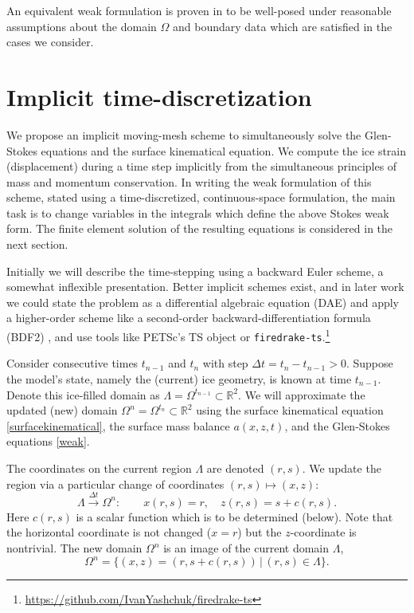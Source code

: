 \documentclass[letterpaper,final,12pt,reqno]{amsart}
\newcommand{\RR}{\mathbb{R}}
\begin{document}
An equivalent weak formulation is proven in \cite[Theorem 3.8]{JouvetRappaz2011} to be well-posed under reasonable assumptions about the domain $\Omega$ and boundary data which are satisfied in the cases we consider.


\section{Implicit time-discretization} \label{sec:implicitstep}

We propose an implicit moving-mesh scheme to simultaneously solve the Glen-Stokes equations and the surface kinematical equation.  We compute the ice strain (displacement) during a time step implicitly from the simultaneous principles of mass and momentum conservation.  In writing the weak formulation of this scheme, stated using a time-discretized, continuous-space formulation, the main task is to change variables in the integrals which define the above Stokes weak form.  The finite element solution of the resulting equations is considered in the next section.

Initially we will describe the time-stepping using a backward Euler scheme, a somewhat inflexible presentation.  Better implicit schemes exist, and in later work we could state the problem as a differential algebraic equation (DAE) and apply a higher-order scheme like a second-order backward-differentiation formula (BDF2) \cite{AscherPetzold1998}, and use tools like PETSc's TS object \cite{Balayetal2020,BuelerBook} or \texttt{firedrake-ts}.\footnote{\url{https://github.com/IvanYashchuk/firedrake-ts}}

Consider consecutive times $t_{n-1}$ and $t_n$ with step $\Delta t = t_n - t_{n-1} > 0$.  Suppose the model's state, namely the (current) ice geometry, is known at time $t_{n-1}$.  Denote this ice-filled domain as $\Lambda = \Omega^{t_{n-1}} \subset \RR^2$.  We will approximate the updated (new) domain $\Omega^n = \Omega^{t_n} \subset \RR^2$ using the surface kinematical equation \eqref{surfacekinematical}, the surface mass balance $a(x,z,t)$, and the Glen-Stokes equations \eqref{weak}.

The coordinates on the current region $\Lambda$ are denoted $(r,s)$.  We update the region via a particular change of coordinates $(r,s) \mapsto (x,z)$:
\begin{equation}
\Lambda \stackrel{\Delta t}{\to} \Omega^n: \qquad x(r,s)=r, \quad z(r,s)=s+c(r,s). \label{changecoords}
\end{equation}
Here $c(r,s)$ is a scalar function which is to be determined (below).  Note that the horizontal coordinate is not changed ($x=r$) but the $z$-coordinate is nontrivial.  The new domain $\Omega^n$ is an image of the current domain $\Lambda$,
\begin{equation}
\Omega^n = \{(x,z)=(r,s+c(r,s)) \,\big|\, (r,s) \in \Lambda\}.  \label{updateddomain}
\end{equation}
\end{document}
